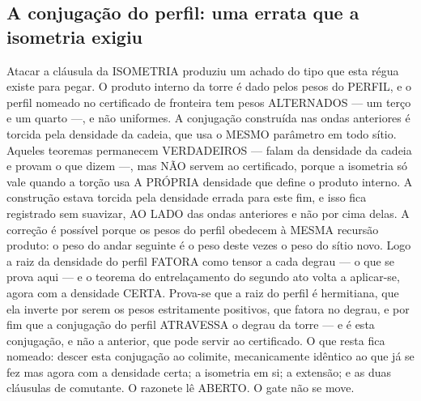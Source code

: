 \documentclass[11pt]{article}
\theoremstyle{definition}\newtheorem{deriv}{Derivação}
\begin{document}
\subsection*{A conjuga\c{c}\~ao do perfil: uma errata que a isometria exigiu}Atacar a cl\'ausula da ISOMETRIA produziu um achado do tipo que esta r\'egua existe para pegar. O produto interno da torre \'e dado pelos pesos do PERFIL, e o perfil nomeado no certificado de fronteira tem pesos ALTERNADOS --- um ter\c{c}o e um quarto ---, e n\~ao uniformes. A conjuga\c{c}\~ao constru\'ida nas ondas anteriores \'e torcida pela densidade da cadeia, que usa o MESMO par\^ametro em todo s\'itio. Aqueles teoremas permanecem VERDADEIROS --- falam da densidade da cadeia e provam o que dizem ---, mas N\~AO servem ao certificado, porque a isometria s\'o vale quando a tor\c{c}\~ao usa A PR\'OPRIA densidade que define o produto interno. A constru\c{c}\~ao estava torcida pela densidade errada para este fim, e isso fica registrado sem suavizar, AO LADO das ondas anteriores e n\~ao por cima delas. A corre\c{c}\~ao \'e poss\'ivel porque os pesos do perfil obedecem \`a MESMA recurs\~ao produto: o peso do andar seguinte \'e o peso deste vezes o peso do s\'itio novo. Logo a raiz da densidade do perfil FATORA como tensor a cada degrau --- o que se prova aqui --- e o teorema do entrela\c{c}amento do segundo ato volta a aplicar-se, agora com a densidade CERTA. Prova-se que a raiz do perfil \'e hermitiana, que ela inverte por serem os pesos estritamente positivos, que fatora no degrau, e por fim que a conjuga\c{c}\~ao do perfil ATRAVESSA o degrau da torre --- e \'e esta conjuga\c{c}\~ao, e n\~ao a anterior, que pode servir ao certificado. O que resta fica nomeado: descer esta conjuga\c{c}\~ao ao colimite, mecanicamente id\^entico ao que j\'a se fez mas agora com a densidade certa; a isometria em si; a extens\~ao; e as duas cl\'ausulas de comutante. O razonete l\^e ABERTO. O gate n\~ao se move.
\end{document}
